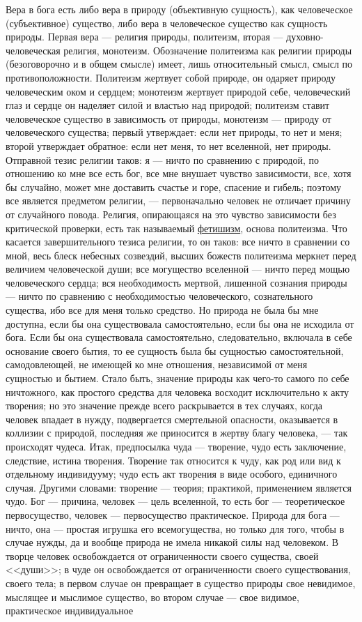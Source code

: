 \documentclass[12pt,oneside]{book}
\begin{document}
Вера в бога есть либо вера в природу (объективную сущность), как человеческое (субъективное) существо, либо вера в человеческое существо как сущность природы. Первая вера --- религия природы, политеизм, вторая --- духовно-человеческая религия, монотеизм. Обозначение политеизма как религии природы (безоговорочно и в общем смысле) имеет, лишь относительный смысл, смысл по противоположности. Политеизм жертвует собой природе, он одаряет природу человеческим оком и сердцем; монотеизм жертвует природой себе, человеческий глаз и сердце он наделяет силой и властью над природой; политеизм ставит человеческое существо в зависимость от природы, монотеизм --- природу от человеческого существа; первый утверждает: если нет природы, то нет и меня; второй утверждает обратное: если нет меня, то нет вселенной, нет природы. Отправной тезис религии таков: я --- ничто по сравнению с природой, по отношению ко мне все есть бог, все мне внушает чувство зависимости, все, хотя бы случайно, может мне доставить счастье и горе, спасение и гибель; поэтому все является предметом религии, --- первоначально человек не отличает причину от случайного повода. Религия, опирающаяся на это чувство зависимости без критической проверки, есть так называемый \underline{фетишизм}, основа политеизма. Что касается завершительного тезиса религии, то он таков: все ничто в сравнении со мной, весь блеск небесных созвездий, высших божеств политеизма меркнет перед величием человеческой души; все могущество вселенной --- ничто перед мощью человеческого сердца; вся необходимость мертвой, лишенной сознания природы --- ничто по сравнению с необходимостью человеческого, сознательного существа, ибо все для меня только средство. Но природа не была бы мне доступна, если бы она существовала самостоятельно, если бы она не исходила от бога. Если бы она существовала самостоятельно, следовательно, включала в себе основание своего бытия, то ее сущность была бы сущностью самостоятельной, самодовлеющей, не имеющей ко мне отношения, независимой от меня сущностью и бытием. Стало быть, значение природы как чего-то самого по себе ничтожного, как простого средства для человека восходит исключительно к акту творения; но это значение прежде всего раскрывается в тех случаях, когда человек впадает в нужду, подвергается смертельной опасности, оказывается в коллизии с природой, последняя же приносится в жертву благу человека, --- так происходят чудеса. Итак, предпосылка чуда --- творение, чудо есть заключение, следствие, истина творения. Творение так относится к чуду, как род или вид к отдельному индивидууму; чудо есть акт творения в виде особого, единичного случая. Другими словами: творение --- теория; практикой, применением является чудо. Бог --- причина, человек --- цель вселенной, то есть бог --- теоретическое первосущество, человек --- первосущество практическое. Природа для бога --- ничто, она --- простая игрушка его всемогущества, но только для того, чтобы в случае нужды, да и вообще природа не имела никакой силы над человеком. В творце человек освобождается от ограниченности своего существа, своей <<души>>; в чуде он освобождается от ограниченности своего существования, своего тела; в первом случае он превращает в существо природы свое невидимое, мыслящее и мыслимое существо, во втором случае --- свое видимое, практическое индивидуальное 
\end{document}
